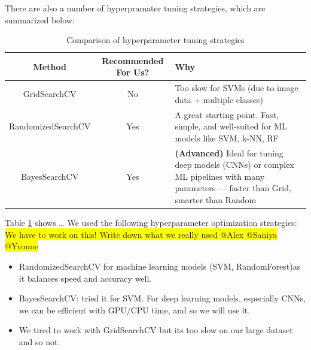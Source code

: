 \documentclass{article}
\begin{document}
There are also a number of hyperpramater tuning strategies, which are summarized below:
\begin{table}[ht]
    \centering
    \renewcommand{\arraystretch}{1.3}
    \begin{tabular}{|c|c|p{8cm}|}
        \hline
        \textbf{Method} & \textbf{Recommended For Us?} & \textbf{Why} \\ \hline
        GridSearchCV & No & Too slow for SVMs (due to image data + multiple classes) \\ \hline
        RandomizedSearchCV & Yes & A great starting point. Fast, simple, and well-suited for ML models like SVM, k-NN, RF \\ \hline
        BayesSearchCV & Yes & \textbf{(Advanced)} Ideal for tuning deep models (CNNs) or complex ML pipelines with many parameters — faster than Grid, smarter than Random \\ \hline
    \end{tabular}
    \caption{Comparison of hyperparameter tuning strategies}
    \label{tab:tuning_methods}
\end{table}

Table \ref{tab:tuning_methods} shows \dots
We used the following hyperparameter optimization strategies: \\
\colorbox{yellow}{We have to work on this! Write down what we really used @Alex @Saniya @Yvonne}
\begin{itemize}
    \item RandomizedSearchCV for machine learning models (SVM, RandomForest)as it balances speed and accuracy well.
    \item BayesSearchCV: tried it for SVM. For deep learning models, especially CNNs, we can be efficient with GPU/CPU time, and so we will use it.
    \item We tired to work with GridSearchCV but its too slow on our large dataset and so not.
\end{itemize}
\end{document}
